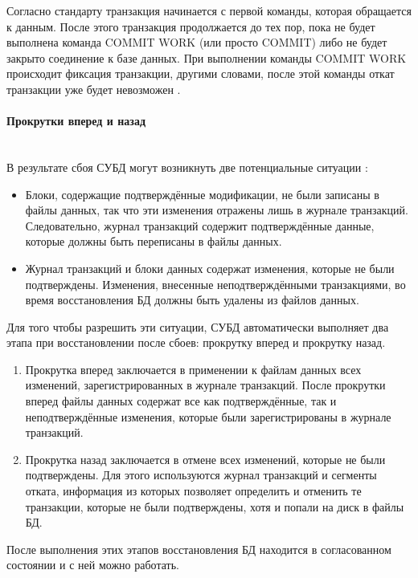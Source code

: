 Согласно стандарту транзакция начинается с первой команды, которая обращается к данным. После этого транзакция продолжается до тех пор, пока не будет выполнена команда COMMIT WORK (или просто COMMIT) либо не будет закрыто соединение к базе данных. При выполнении команды COMMIT WORK происходит фиксация транзакции, другими словами, после этой команды откат транзакции уже будет невозможен \autocite{Pirogov2009}.


\paragraph{Прокрутки вперед и назад} ~\\

В результате сбоя СУБД могут возникнуть две потенциальные ситуации \autocite{Karpova2009}:

\begin{itemize}
    \item Блоки, содержащие подтверждённые модификации, не были записаны в файлы данных, так что эти изменения отражены лишь в журнале транзакций. Следовательно, журнал транзакций содержит подтверждённые данные, которые должны быть переписаны в файлы данных.
    \item Журнал транзакций и блоки данных содержат изменения, которые не были подтверждены. Изменения, внесенные неподтверждёнными транзакциями, во время восстановления БД должны быть удалены из файлов данных.
\end{itemize}

Для того чтобы разрешить эти ситуации, СУБД автоматически выполняет два этапа при восстановлении после сбоев: прокрутку вперед и прокрутку назад.

\begin{enumerate}
    \item Прокрутка вперед заключается в применении к файлам данных всех изменений, зарегистрированных в журнале транзакций. После прокрутки вперед файлы данных содержат все как подтверждённые, так и неподтверждённые изменения, которые были зарегистрированы в журнале транзакций.
    \item Прокрутка назад заключается в отмене всех изменений, которые не были подтверждены. Для этого используются журнал транзакций и сегменты отката, информация из которых позволяет определить и отменить те транзакции, которые не были подтверждены, хотя и попали на диск в файлы БД.
\end{enumerate}

После выполнения этих этапов восстановления БД находится в согласованном состоянии и с ней можно работать.

